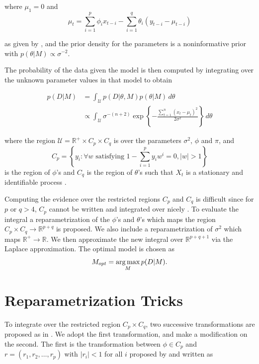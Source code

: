 where $\mu_1 = 0$ and $$\mu_t = \sum_{i=1}^p \phi_i x_{t-i} - \sum_{i=1}^q \theta_i(y_{t-i} - \mu_{t-i})$$

as given by \cite{marriott1993}, and the prior density for the parameters is a noninformative prior with $p(\theta | M) \propto \sigma^{-2}$.  

The probability of the data given the model is then computed by integrating over the unknown parameter values in that model to obtain 

\begin{align*}
    \label{evidence}
    p(D|M) &= \int_{\mathcal{U}} p(D|\theta, M) p(\theta | M) \, d\theta\\
    &\propto \int_{\mathcal{U}} \sigma^{-(n+2)} \exp\left\{-\frac{\sum_{t=1}^n (x_t - \mu_t)^2}{2\sigma^2}\right\} \, d\theta \tag{2}
\end{align*}

where the region $\mathcal{U} = \mathbb{R}^+ \times C_p \times C_q$ is over the parameters $\sigma^2$, $\phi$ and $\pi$, and  $$C_p  = \left\{ y_i : \forall w \text{ satisfying } 1 - \sum_{i=1}^p y_i w^i = 0, |w| > 1 \right\}$$ is the region of $\phi$'s and $C_q$ is the region of $\theta$'s such that $X_t$ is a stationary and identifiable process \cite{monahan1982}. 

Computing the evidence over the restricted regions $C_p$ and  $C_q$ is difficult since for $p$ or $q > 4$, $C_p$ cannot be written and integrated over nicely \cite{marriott1993}.     To evaluate the integral a reparametrization of the $\phi$'s and $\theta$'s which maps the region $C_p \times C_q \rightarrow \mathbb{R}^{p+q}$ is proposed. We also include a reparametrization of $\sigma^2$ which maps $\mathbb{R}^+ \rightarrow \mathbb{R}$. We then approximate the new integral  over $\mathbb{R}^{p+q+1}$ via the Laplace approximation.  The optimal model is chosen as
$$M_{opt} = \operatorname*{arg\,max}_{M} p(D|M).$$


\section{Reparametrization Tricks}
\label{sec: reparametrization}

To integrate over the restricted region $C_p \times C_q$, two successive transformations are proposed as in \cite{marriott1993}.  We adopt the first transformation, and make a modification on the second. The first is the transformation between $\phi \in C_p$ and $r = (r_1, r_2, \dots, r_p)$ with $|r_i|<1$ for all $i$ proposed by \cite{marriott1993} and written as

